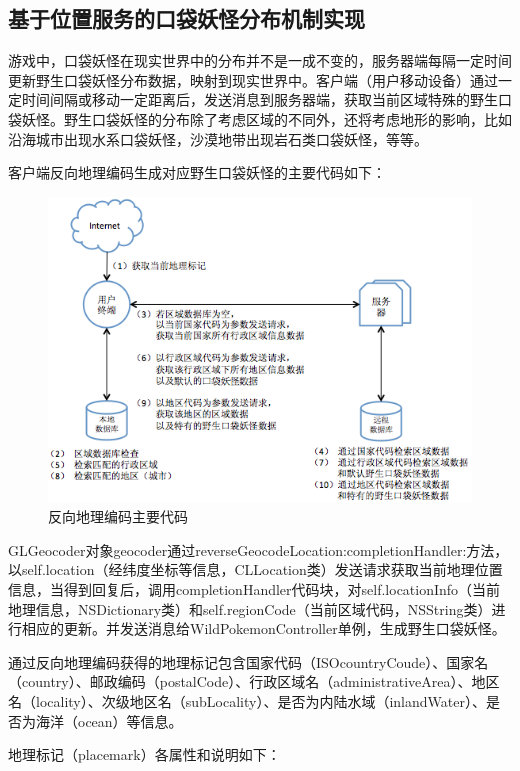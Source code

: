 \documentclass{article}
\begin{document}
\begin{CJK}{UTF8}{gbsn}
	\subsection{基于位置服务的口袋妖怪分布机制实现}
  游戏中，口袋妖怪在现实世界中的分布并不是一成不变的，服务器端每隔一定时间更新野生口袋妖怪分布数据，映射到现实世界中。客户端（用户移动设备）通过一定时间间隔或移动一定距离后，发送消息到服务器端，获取当前区域特殊的野生口袋妖怪。野生口袋妖怪的分布除了考虑区域的不同外，还将考虑地形的影响，比如沿海城市出现水系口袋妖怪，沙漠地带出现岩石类口袋妖怪，等等。

  客户端反向地理编码生成对应野生口袋妖怪的主要代码如下：
   \begin{figure}[htbp]
		\centering
		\includegraphics[bb=0 0 749 669, scale=0.45]{figure/fig_n19.png}
		\caption{反向地理编码主要代码}
		\label{fig:n19}
	\end{figure}

  GLGeocoder对象geocoder通过reverseGeocodeLocation:completionHandler:方法，以self.location（经纬度坐标等信息，CLLocation类）发送请求获取当前地理位置信息，当得到回复后，调用completionHandler代码块，对self.locationInfo（当前地理信息，NSDictionary类）和self.regionCode（当前区域代码，NSString类）进行相应的更新。并发送消息给WildPokemonController单例，生成野生口袋妖怪。

  通过反向地理编码获得的地理标记包含国家代码（ISOcountryCoude）、国家名（country）、邮政编码（postalCode）、行政区域名（administrativeArea）、地区名（locality）、次级地区名（subLocality）、是否为内陆水域（inlandWater）、是否为海洋（ocean）等信息。

  地理标记（placemark）各属性和说明如下：


\end{CJK}
\end{document}
